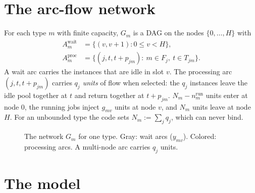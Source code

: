 \documentclass[11pt,a4paper]{article}
\newcommand{\run}{\mathrm{run}}
\begin{document}
\section{The arc-flow network}\label{sec:network}

For each type $m$ with finite capacity, $G_m$ is a DAG on the nodes
$\{0,\dots,H\}$ with
\begin{align*}
  A^{\mathrm{wait}}_m&=\{(v,v+1):0\le v<H\},\\
  A^{\mathrm{proc}}_m&=\{(j,t,t+p_{jm}):\ m\in F_j,\ t\in T_{jm}\}.
\end{align*}
A wait arc carries the instances that are idle in slot $v$. The processing arc
$(j,t,t+p_{jm})$ carries \emph{$q_j$ units} of flow when selected: the $q_j$
instances leave the idle pool together at $t$ and return together at
$t+p_{jm}$. $N_m-n^\run_m$ units enter at node $0$, the running jobs inject
$g_{mv}$ units at node $v$, and $N_m$ units leave at node $H$. For an unbounded
type the code sets $N_m:=\sum_j q_j$, which can never bind.

\begin{figure}[h]
\centering
{}
\caption{The network $G_m$ for one type. Gray: wait arcs ($y_{mv}$). Colored:
processing arcs. A multi-node arc carries $q_j$ units.}
\end{figure}

\section{The model}\label{sec:model}
\end{document}
